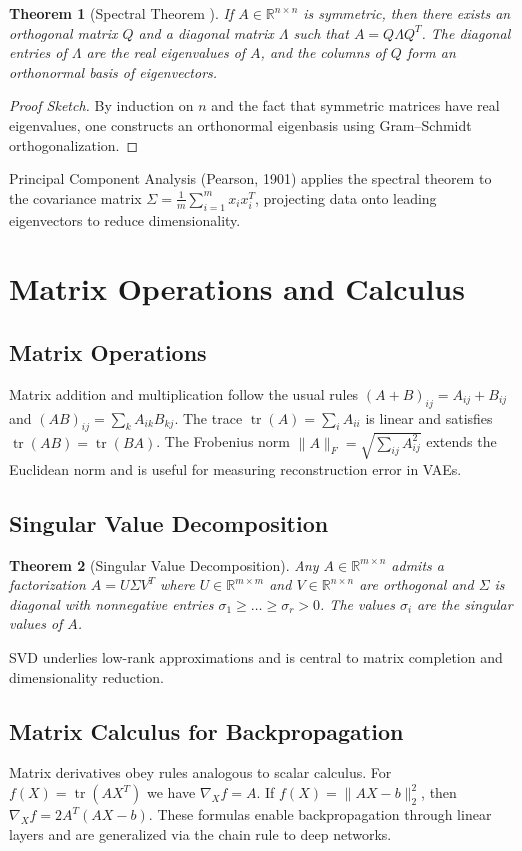 \documentclass[11pt]{book}
\newtheorem{theorem}{Theorem}[chapter]
\begin{document}
\begin{theorem}[Spectral Theorem \cite{hilbert1904}]
If $A\in\mathbb{R}^{n\times n}$ is symmetric, then there exists an orthogonal matrix $Q$ and a diagonal matrix $\Lambda$ such that $A=Q\Lambda Q^T$. The diagonal entries of $\Lambda$ are the real eigenvalues of $A$, and the columns of $Q$ form an orthonormal basis of eigenvectors.
\end{theorem}
\begin{proof}[Proof Sketch]
By induction on $n$ and the fact that symmetric matrices have real eigenvalues, one constructs an orthonormal eigenbasis using Gram--Schmidt orthogonalization.
\end{proof}
Principal Component Analysis (Pearson, 1901) applies the spectral theorem to the covariance matrix $\Sigma=\tfrac1m\sum_{i=1}^m x_ix_i^T$, projecting data onto leading eigenvectors to reduce dimensionality.

\section{Matrix Operations and Calculus}
\subsection{Matrix Operations}
Matrix addition and multiplication follow the usual rules $(A+B)_{ij}=A_{ij}+B_{ij}$ and $(AB)_{ij}=\sum_k A_{ik}B_{kj}$. The trace $\operatorname{tr}(A)=\sum_i A_{ii}$ is linear and satisfies $\operatorname{tr}(AB)=\operatorname{tr}(BA)$. The Frobenius norm $\|A\|_F=\sqrt{\sum_{ij}A_{ij}^2}$ extends the Euclidean norm and is useful for measuring reconstruction error in VAEs.

\subsection{Singular Value Decomposition}
\begin{theorem}[Singular Value Decomposition]
Any $A\in\mathbb{R}^{m\times n}$ admits a factorization $A=U\Sigma V^T$ where $U\in\mathbb{R}^{m\times m}$ and $V\in\mathbb{R}^{n\times n}$ are orthogonal and $\Sigma$ is diagonal with nonnegative entries $\sigma_1\ge\dots\ge\sigma_r>0$. The values $\sigma_i$ are the \emph{singular values} of $A$.
\end{theorem}
SVD underlies low-rank approximations and is central to matrix completion and dimensionality reduction.

\subsection{Matrix Calculus for Backpropagation}
Matrix derivatives obey rules analogous to scalar calculus. For $f(X)=\operatorname{tr}(AX^T)$ we have $\nabla_X f=A$. If $f(X)=\|AX-b\|_2^2$, then $\nabla_X f=2A^T(AX-b)$. These formulas enable backpropagation through linear layers and are generalized via the chain rule to deep networks.
\end{document}
